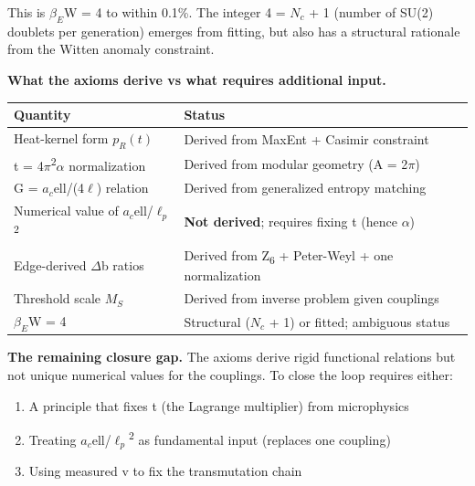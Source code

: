 \documentclass[11pt,a4paper]{article}
\theoremstyle{remark}
\providecommand{\tightlist}{%
  \setlength{\itemsep}{0pt}\setlength{\parskip}{0pt}}
\begin{document}
This is \(\ensuremath{\beta}_E\)W = 4 to within 0.1\%. The integer 4 = \(N_c\) + 1 (number of SU(2) doublets per generation) emerges from fitting, but also has a structural rationale from the Witten anomaly constraint.

\textbf{What the axioms derive vs what requires additional input.}

{\def\LTcaptype{none} %
\begin{longtable}[]{@{}
  >{\raggedright\arraybackslash}p{}
  >{\raggedright\arraybackslash}p{}@{}}
\toprule\noalign{}
\begin{minipage}[b]{\linewidth}\raggedright
Quantity
\end{minipage} & \begin{minipage}[b]{\linewidth}\raggedright
Status
\end{minipage} \\
\midrule\noalign{}
\endhead
\bottomrule\noalign{}
\endlastfoot
Heat-kernel form \(p_R(t)\) & Derived from MaxEnt + Casimir constraint \\
t = 4\ensuremath{\pi}\textsuperscript{2}\ensuremath{\alpha} normalization & Derived from modular geometry (A = 2\ensuremath{\pi}) \\
G = \(a_c\)ell/(4\ensuremath{\ell}) relation & Derived from generalized entropy matching \\
Numerical value of \(a_c\)ell/\(\ensuremath{\ell}_p\)\textsuperscript{2} & \textbf{Not derived}; requires fixing t (hence \ensuremath{\alpha}) \\
Edge-derived \ensuremath{\Delta}b ratios & Derived from Z\textsubscript{6} + Peter-Weyl + one normalization \\
Threshold scale \(M_S\) & Derived from inverse problem given couplings \\
\(\ensuremath{\beta}_E\)W = 4 & Structural (\(N_c\) + 1) or fitted; ambiguous status \\
\end{longtable}
}

\textbf{The remaining closure gap.} The axioms derive rigid functional relations but not unique numerical values for the couplings. To close the loop requires either:

\begin{enumerate}
\def\labelenumi{\arabic{enumi}.}
\tightlist
\item
  A principle that fixes t (the Lagrange multiplier) from microphysics
\item
  Treating \(a_c\)ell/\(\ensuremath{\ell}_p\)\textsuperscript{2} as fundamental input (replaces one coupling)
\item
  Using measured v to fix the transmutation chain
\end{enumerate}
\end{document}
